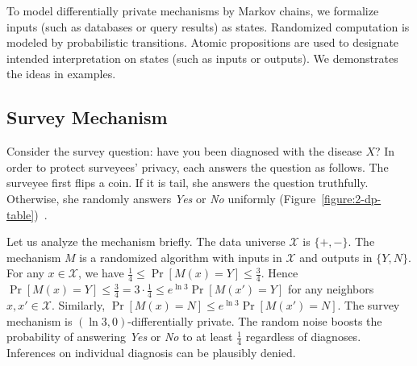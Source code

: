 To model differentially private mechanisms by Markov chains, we
formalize inputs (such as databases or query results) as states. 
Randomized computation is modeled by probabilistic transitions. Atomic
propositions are used to designate intended interpretation on states
(such as inputs or outputs). We demonstrates the ideas in examples.


\subsection{Survey Mechanism}
\label{subsec:survey}

Consider the survey question: have you been diagnosed
with the disease $X$? In order to protect surveyees' privacy, each
answers the question as follows. The surveyee first flips a
coin. If it is tail, she answers the question truthfully. Otherwise,
she randomly answers \textit{Yes} or \textit{No}
uniformly (Figure~\ref{figure:2-dp-table})~\cite{DR:14:AFDP}.

Let us analyze the mechanism briefly. The data universe $\mathcal{X}$
is $\{ +, - \}$. The mechanism $M$ is a randomized algorithm with
inputs in $\mathcal{X}$ and outputs in $\{ Y, N \}$. For any $x \in
\mathcal{X}$, we have $\frac{1}{4} \leq \Pr[M (x) = Y] \leq
\frac{3}{4}$. Hence $\Pr[M (x) = Y] \leq \frac{3}{4} = 3 \cdot
\frac{1}{4} \leq e^{\ln 3} \Pr[M (x') = Y]$ for any neighbors $x, x'
\in \mathcal{X}$. Similarly, $\Pr[M (x) = N] \leq e^{\ln 3} \Pr[M (x')
= N]$. The survey mechanism is $(\ln 3, 0)$-differentially private.
The random noise boosts the probability of answering
\textit{Yes} or \textit{No} to at least $\frac{1}{4}$ regardless of
diagnoses. Inferences on individual diagnosis can be plausibly denied.

